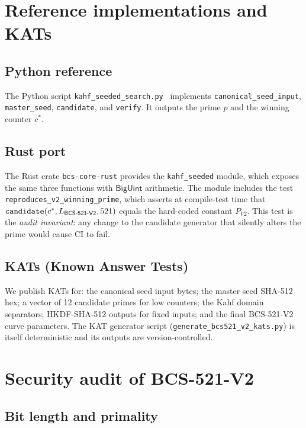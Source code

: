 \documentclass[11pt,a4paper]{article}
\theoremstyle{plain}
\theoremstyle{definition}
\newcommand{\BCSV}{\textsf{BCS\hbox{-}521\hbox{-}V2}}
\begin{document}
\section{Reference implementations and KATs}
\label{sec:rust}

\subsection{Python reference}

The Python script \texttt{kahf\_seeded\_search.py}~\cite{BCSrepo}
implements \texttt{canonical\_seed\_input}, \texttt{master\_seed},
\texttt{candidate}, and \texttt{verify}. It outputs the prime $p$
and the winning counter $c^{*}$.

\subsection{Rust port}

The Rust crate \texttt{bcs-core-rust} provides the
\texttt{kahf\_seeded} module, which exposes the same three functions
with $\textsf{BigUint}$ arithmetic. The module includes the test
\texttt{reproduces\_v2\_winning\_prime}, which asserts at compile-test
time that $\texttt{candidate}(c^{*}, L_{\BCSV}, 521)$ equals the
hard-coded constant $P_{V2}$. This test is the
\emph{audit invariant}: any change to the candidate generator that
silently alters the prime would cause CI to fail.

\subsection{KATs (Known Answer Tests)}

We publish KATs for: the canonical seed input bytes; the master seed
SHA-512 hex; a vector of 12 candidate primes for low counters; the
Kahf domain separators; HKDF-SHA-512 outputs for fixed inputs; and
the final BCS-521-V2 curve parameters. The KAT generator script
(\texttt{generate\_bcs521\_v2\_kats.py}) is itself deterministic and
its outputs are version-controlled.

\section{Security audit of \BCSV{}}
\label{sec:audit}

\subsection{Bit length and primality}
\end{document}
